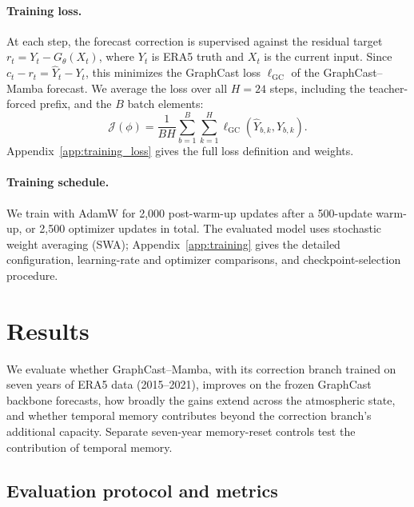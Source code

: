 \documentclass{article}
\newcommand{\suozhi}[1]{}
\renewcommand{\suozhi}[1]{}
\begin{document}
\paragraph{Training loss.}
At each step, the forecast correction is supervised against the residual target $r_t=Y_t-G_\theta(X_t)$, where $Y_t$ is ERA5 truth and $X_t$ is the current input. Since $c_t-r_t=\hat{Y}_t-Y_t$, this minimizes the {GraphCast loss} $\ell_{\mathrm{GC}}$ of the GraphCast--Mamba forecast. We average the loss over all $H=24$ steps, including the teacher-forced prefix, and the $B$ batch elements:
\begin{equation}
    \mathcal{J}(\phi)
    =\frac{1}{BH}\sum_{b=1}^{B}\sum_{k=1}^{H}
      \ell_{\mathrm{GC}}(\hat{Y}_{b,k},Y_{b,k}).
    \label{eq:training_objective}
\end{equation}
Appendix~\ref{app:training_loss} gives the full loss definition and weights.

\paragraph{Training schedule.}
We train with AdamW for 2,000 post-warm-up updates after a 500-update warm-up, or 2,500 optimizer updates in total. The evaluated model uses stochastic weight averaging (SWA); Appendix~\ref{app:training} gives the detailed configuration, {learning-rate and optimizer comparisons}, and checkpoint-selection procedure.


\section{Results}
\label{sec:numerical}

We evaluate whether GraphCast--Mamba, with its correction branch trained on seven years of ERA5 data (2015--2021), improves on the frozen GraphCast backbone forecasts, how broadly the gains extend across the atmospheric state, and whether temporal memory contributes beyond the correction branch's additional capacity. Separate seven-year memory-reset controls test the contribution of temporal memory.

\subsection{Evaluation protocol and metrics}
\label{sec:eval_protocol}
\end{document}
